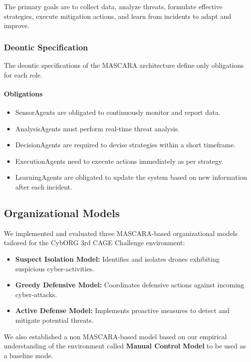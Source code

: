 \documentclass[conference]{IEEEtran}
\begin{document}
The primary goals are to collect data, analyze threats, formulate effective strategies, execute mitigation actions, and learn from incidents to adapt and improve.

\subsubsection*{Deontic Specification}

The deontic specifications of the MASCARA architecture define only obligations for each role.

\paragraph*{Obligations}

\begin{itemize}
    \item SensorAgents are obligated to continuously monitor and report data.
    \item AnalysisAgents must perform real-time threat analysis.
    \item DecisionAgents are required to devise strategies within a short timeframe.
    \item ExecutionAgents need to execute actions immediately as per strategy.
    \item LearningAgents are obligated to update the system based on new information after each incident.
\end{itemize}


\subsection{Organizational Models}

We implemented and evaluated three MASCARA-based organizational models tailored for the CybORG 3rd CAGE Challenge environment:

\begin{itemize}
    \item \textbf{Suspect Isolation Model:} Identifies and isolates drones exhibiting suspicious cyber-activities.
    \item \textbf{Greedy Defensive Model:} Coordinates defensive actions against incoming cyber-attacks.
    \item \textbf{Active Defense Model:} Implements proactive measures to detect and mitigate potential threats.
\end{itemize}

We also established a non MASCARA-based model based on our empirical understanding of the environment called \textbf{Manual Control Model} to be used as a baseline mode.
\end{document}
